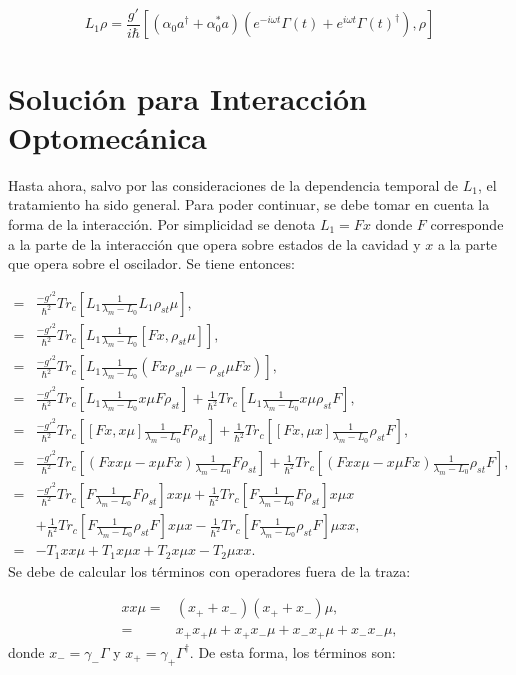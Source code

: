 \documentclass[a4paper,10pt]{report}
\begin{document}
\begin{equation}
L_1\rho= \frac{g'}{i\hbar}[(\alpha_0 a^{\dagger}+ \alpha_0^* a)(e^{-i\omega t}\Gamma(t)+e^{i\omega t}\Gamma(t)^{\dagger}),\rho]
\end{equation} 
 
\section{Solución para Interacción Optomecánica}

Hasta ahora, salvo por las consideraciones de la dependencia temporal de $L_1$, el tratamiento ha sido general. Para poder continuar, se debe tomar en cuenta la forma de la interacción. Por simplicidad se denota $L_1=Fx$ donde $F$ corresponde a la parte de la interacción que opera sobre estados de la cavidad y $x$ a la parte que opera sobre el oscilador. Se tiene entonces:

\begin{align*}
=&\frac{-g'^2}{\hbar^2} Tr_c[L_1\frac{1}{\lambda_m - L_0}L_1 \rho_{st}\mu],\\
=&\frac{-g'^2}{\hbar^2} Tr_c[L_1\frac{1}{\lambda_m - L_0}[Fx, \rho_{st}\mu]],\\
=&\frac{-g'^2}{\hbar^2} Tr_c[L_1\frac{1}{\lambda_m - L_0}(Fx\rho_{st}\mu-\rho_{st}\mu Fx)],\\
=&\frac{-g'^2}{\hbar^2} Tr_c[L_1\frac{1}{\lambda_m - L_0}x\mu F\rho_{st}]+\frac{1}{\hbar^2}Tr_c[L_1\frac{1}{\lambda_m - L_0}x\mu \rho_{st}F],\\
=&\frac{-g'^2}{\hbar^2} Tr_c[[Fx,x\mu]\frac{1}{\lambda_m - L_0} F\rho_{st}]+\frac{1}{\hbar^2}Tr_c[[Fx,\mu x]\frac{1}{\lambda_m - L_0}\rho_{st}F],\\
=&\frac{-g'^2}{\hbar^2} Tr_c[(Fxx\mu-x\mu Fx)\frac{1}{\lambda_m - L_0} F\rho_{st}]+\frac{1}{\hbar^2}Tr_c[(Fxx\mu-x\mu Fx)\frac{1}{\lambda_m - L_0}\rho_{st}F],\\
=&\frac{-g'^2}{\hbar^2} Tr_c[F\frac{1}{\lambda_m - L_0}F\rho_{st}]xx\mu+\frac{1}{\hbar^2}Tr_c[F\frac{1}{\lambda_m - L_0}F\rho_{st}]x\mu x\\
 &+\frac{1}{\hbar^2} Tr_c[F\frac{1}{\lambda_m - L_0}\rho_{st}F]x\mu x-\frac{1}{\hbar^2}Tr_c[F\frac{1}{\lambda_m - L_0}\rho_{st}F]\mu xx,\\
=&-T_1xx\mu+T_1x\mu x + T_2x\mu x - T_2\mu xx.
\end{align*} Se debe de calcular los términos con operadores fuera de la traza:

\begin{align*}
xx\mu=& (x_++x_-)(x_++x_-)\mu,\\
=&x_+x_+\mu + x_+x_-\mu + x_-x_+\mu + x_-x_-\mu, 
\end{align*} donde $x_- = \gamma_- \Gamma$ y $x_+ = \gamma_+ \Gamma^{\dagger}$. De esta forma, los términos son:
\end{document}
